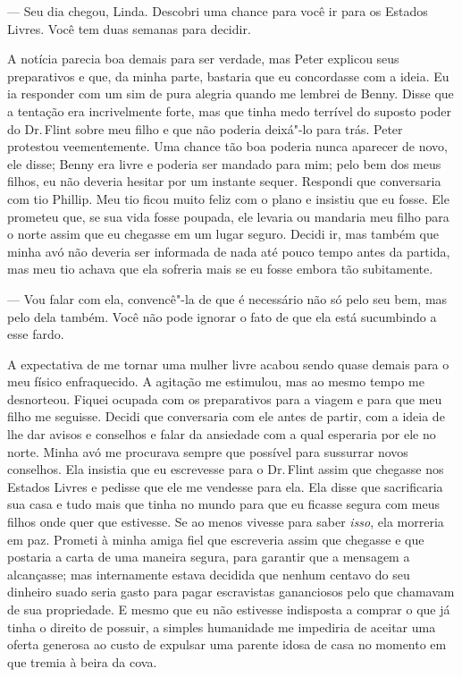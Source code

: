 --- Seu dia chegou, Linda. Descobri uma chance para você ir para os
Estados Livres. Você tem duas semanas para decidir.

A notícia parecia boa demais para ser verdade, mas Peter explicou seus
preparativos e que, da minha parte, bastaria que eu concordasse com a
ideia. Eu ia responder com um sim de pura alegria quando me lembrei de
Benny. Disse que a tentação era incrivelmente forte, mas que tinha medo
terrível do suposto poder do Dr.\,Flint sobre meu filho e que não poderia
deixá"-lo para trás. Peter protestou veementemente. Uma chance tão boa
poderia nunca aparecer de novo, ele disse; Benny era livre e poderia ser
mandado para mim; pelo bem dos meus filhos, eu não deveria hesitar por
um instante sequer. Respondi que conversaria com tio Phillip. Meu tio
ficou muito feliz com o plano e insistiu que eu fosse. Ele prometeu que,
se sua vida fosse poupada, ele levaria ou mandaria meu filho para o
norte assim que eu chegasse em um lugar seguro. Decidi ir, mas também
que minha avó não deveria ser informada de nada até pouco tempo antes da
partida, mas meu tio achava que ela sofreria mais se eu fosse embora tão
subitamente.

--- Vou falar com ela, convencê"-la de que é necessário não só pelo seu
bem, mas pelo dela também. Você não pode ignorar o fato de que ela está
sucumbindo a esse fardo.


A expectativa de me tornar uma mulher
livre acabou sendo quase demais para o meu físico enfraquecido. A
agitação me estimulou, mas ao mesmo tempo me desnorteou. Fiquei ocupada
com os preparativos para a viagem e para que meu filho me seguisse.
Decidi que conversaria com ele antes de partir, com a ideia de lhe dar
avisos e conselhos e falar da ansiedade com a qual esperaria por ele no
norte. Minha avó me procurava sempre que possível para sussurrar novos
conselhos. Ela insistia que eu escrevesse para o Dr.\,Flint assim que
chegasse nos Estados Livres e pedisse que ele me vendesse para ela. Ela
disse que sacrificaria sua casa e tudo mais que tinha no mundo para que
eu ficasse segura com meus filhos onde quer que estivesse. Se ao menos
vivesse para saber \emph{isso}, ela morreria em paz. Prometi à minha
amiga fiel que escreveria assim que chegasse e que postaria a carta de
uma maneira segura, para garantir que a mensagem a alcançasse; mas
internamente estava decidida que nenhum centavo do seu dinheiro suado
seria gasto para pagar escravistas gananciosos pelo que chamavam de sua
propriedade. E mesmo que eu não estivesse indisposta a comprar o que já
tinha o direito de possuir, a simples humanidade me impediria de aceitar
uma oferta generosa ao custo de expulsar uma parente idosa de casa no
momento em que tremia à beira da cova.

